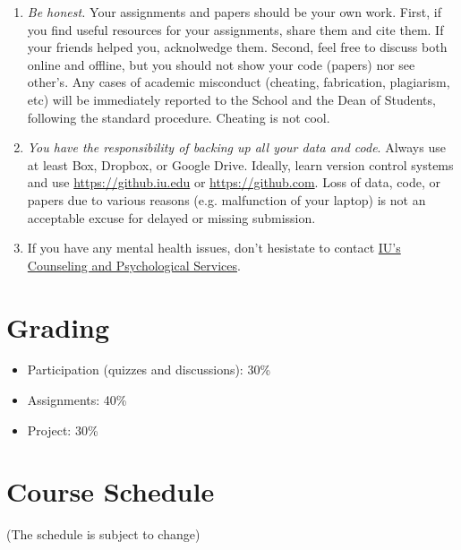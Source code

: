 \documentclass[11pt,article,oneside]{memoir} %
\begin{document}
\begin{enumerate}
\item \emph{Be honest.} Your assignments and papers should be your own work.
First, if you find useful resources for your assignments, share them and cite
them. If your friends helped you, acknolwedge them. Second, feel free to
discuss both online and offline, but you should not show your code (papers) nor
see other's. Any cases of academic misconduct (cheating, fabrication,
plagiarism, etc) will be immediately reported to the School and the Dean of
Students, following the standard procedure. Cheating is not cool. 

\item \emph{You have the responsibility of backing up all your data and code}.
Always use at least Box, Dropbox, or Google Drive. Ideally, learn version
control systems and use \url{https://github.iu.edu} or
\url{https://github.com}. Loss of data, code, or papers due to various reasons
(e.g. malfunction of your laptop) is not an acceptable excuse for delayed or
missing submission. 

\item If you have any mental health issues, don't hesistate to contact
\href{http://jhealthcenter.indiana.edu/counseling/index.shtml}{IU's Counseling
and Psychological Services}. 


\end{enumerate}
\section{Grading} %
\label{sec:grading_tentative_}

\begin{itemize}

\item Participation (quizzes and discussions): 30\%

\item Assignments: 40\%


\item Project: 30\%

\end{itemize}
\section{Course Schedule}

(The schedule is subject to change)
\end{document}
